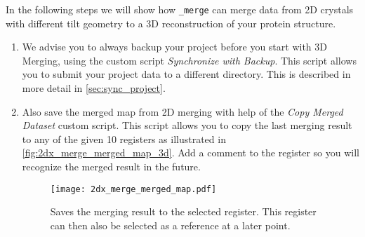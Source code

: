 In the following steps we will show how {\twodx}\texttt{\_merge} can merge data from 2D crystals with different tilt geometry to a 3D reconstruction of your protein structure.  
\begin{enumerate}
	\item We advise you to always  backup your project before you start with 3D Merging, using the custom script \textit{Synchronize with Backup}. This script allows you to submit your project data to a different directory. This is described in more detail in \autoref{sec:sync_project}.
	\item Also save the merged map from 2D merging with help of the \textit{Copy Merged Dataset} custom script. This script allows you to copy the last merging result to any of the given 10 registers as illustrated in \autoref{fig:2dx_merge_merged_map_3d}.  Add a comment to the register so you will recognize the merged result in the future.
	\begin{figure}[H]
		\centering
		\texttt{[image: 2dx\_merge\_merged\_map.pdf]}
		\caption{Saves the merging result to the selected register. This register can then also be selected as a reference at a later point.}
		\label{fig:2dx_merge_merged_map_3d}
	\end{figure}
	

\end{enumerate}

